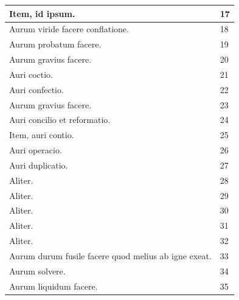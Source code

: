 \documentclass[a4paper, 11pt, oneside, polutonikogreek, italian]{article}
\begin{document}
\begin{center}
\begin{longtable}{|p{60mm}|l|}
         Item, id ipsum.                                                                 & 17 \\ \hline
         Aurum viride facere conflatione.                                                & 18 \\ \hline
         Aurum probatum facere.                                                          & 19 \\ \hline
         Aurum gravius facere.                                                           & 20 \\ \hline
         Auri coctio.                                                                    & 21 \\ \hline
         Auri confectio.                                                                 & 22 \\ \hline
         Aurum gravius facere.                                                           & 23 \\ \hline
         Auri concilio et reformatio.                                                    & 24 \\ \hline
         Item, auri contio.                                                              & 25 \\ \hline
         Auri operacio.                                                                  & 26 \\ \hline
         Auri duplicatio.                                                                & 27 \\ \hline
         Aliter.                                                                         & 28 \\ \hline
         Aliter.                                                                         & 29 \\ \hline
         Aliter.                                                                         & 30 \\ \hline
         Aliter.                                                                         & 31 \\ \hline
         Aliter.                                                                         & 32 \\ \hline
         Aurum durum fusile facere quod melius ab igne exeat.                            & 33 \\ \hline
         Aurum solvere.                                                                  & 34 \\ \hline
         Aurum liquidum facere.                                                          & 35 \\ \hline

\end{longtable}
\end{center}
\end{document}
